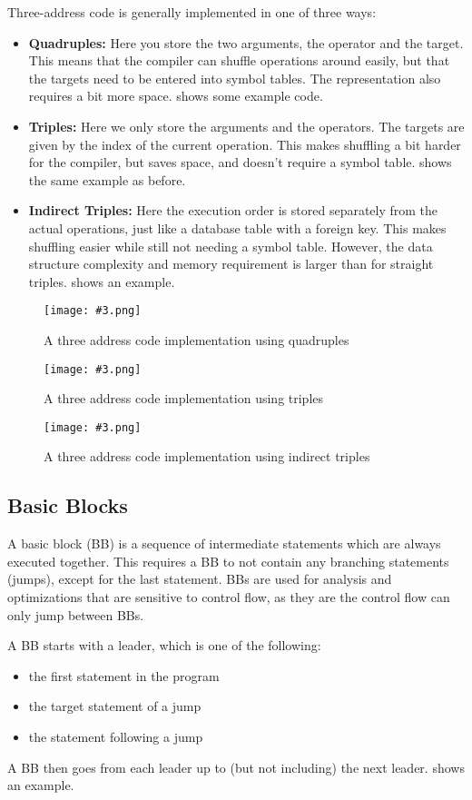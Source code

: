 \documentclass{article}
\newcommand{\fig}[4]{
	\begin{figure}[#1]
		\center
		\texttt{[image: \#3.png]}
		\caption{#4}
		\label{fig:#3}
	\end{figure}
	}
\begin{document}
Three-address code is generally implemented in one of three ways:
\begin{itemize}
	\item \textbf{Quadruples:} Here you store the two arguments, the operator and the target.
		This means that the compiler can shuffle operations around easily, but that the targets need to be entered into symbol tables.
		The representation also requires a bit more space.
		 shows some example code.
	\item \textbf{Triples:} Here we only store the arguments and the operators.
		The targets are given by the index of the current operation.
		This makes shuffling a bit harder for the compiler, but saves space, and doesn't require a symbol table.
		 shows the same example as before.
	\item \textbf{Indirect Triples:} Here the execution order is stored separately from the actual operations, just like a database table with a foreign key.
		This makes shuffling easier while still not needing a symbol table.
		However, the data structure complexity and memory requirement is larger than for straight triples.
		 shows an example.
\end{itemize}

\fig{h}{}{quadruples}{A three address code implementation using quadruples}
\fig{h}{}{triples}{A three address code implementation using triples}
\fig{h}{}{indirect}{A three address code implementation using indirect triples}

\subsection{Basic Blocks}
A basic block (BB) is a sequence of intermediate statements which are always executed together.
This requires a BB to not contain any branching statements (jumps), except for the last statement.
BBs are used for analysis and optimizations that are sensitive to control flow, as they are the control flow can only jump between BBs.

A BB starts with a leader, which is one of the following:
\begin{itemize}
	\item the first statement in the program
	\item the target statement of a jump
	\item the statement following a jump
\end{itemize}
A BB then goes from each leader up to (but not including) the next leader.
 shows an example.
\end{document}
